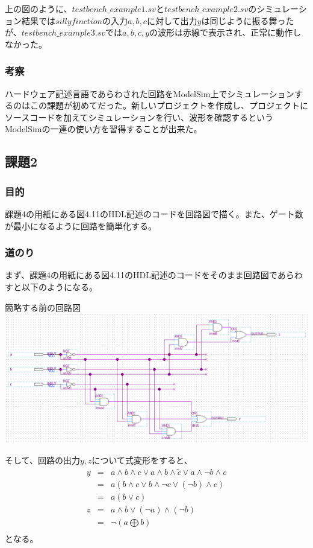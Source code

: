 \documentclass[a4paper]{jarticle}
\begin{document}
上の図のように、$testbench\_example1.sv$と$testbench\_example2.sv$のシミュレーション結果では$sillyfinction$の入力$a,b,c$に対して出力$y$は同じように振る舞ったが、$testbench\_example3.sv$では$a,b,c,y$の波形は赤線で表示され、正常に動作しなかった。
\subsubsection{考察}
ハードウェア記述言語であらわされた回路をModelSim上でシミュレーションするのはこの課題が初めてだった。新しいプロジェクトを作成し、プロジェクトにソースコードを加えてシミュレーションを行い、波形を確認するというModelSimの一連の使い方を習得することが出来た。
\subsection{課題2}
\subsubsection{目的}
課題4の用紙にある図4.11のHDL記述のコードを回路図で描く。また、ゲート数が最小になるように回路を簡単化する。
\subsubsection{道のり}
まず、課題4の用紙にある図4.11のHDL記述のコードをそのまま回路図であらわすと以下のようになる。
\begin{center}
	簡略する前の回路図
	\includegraphics[width=15cm]{2-l-1.PNG}
\end{center}
そして、回路の出力$y,z$について式変形をすると、
\begin{eqnarray*}
	y & = & a \land b \land c \lor a \land b \land \tilde{c} \lor a \land \lnot b \land c \nonumber \\
	  & = & a \left( b \land c \lor b \land \lnot c \lor \left( \lnot b \right) \land c \right) \nonumber \\
	  & = & a \left( b \lor c \right) \nonumber \\
	z & = & a \land b \lor \left( \lnot a \right) \land \left( \lnot b \right) \nonumber \\
	  & = & \lnot \left( a \bigoplus b \right) \nonumber \\
\end{eqnarray*}
となる。
\end{document}
